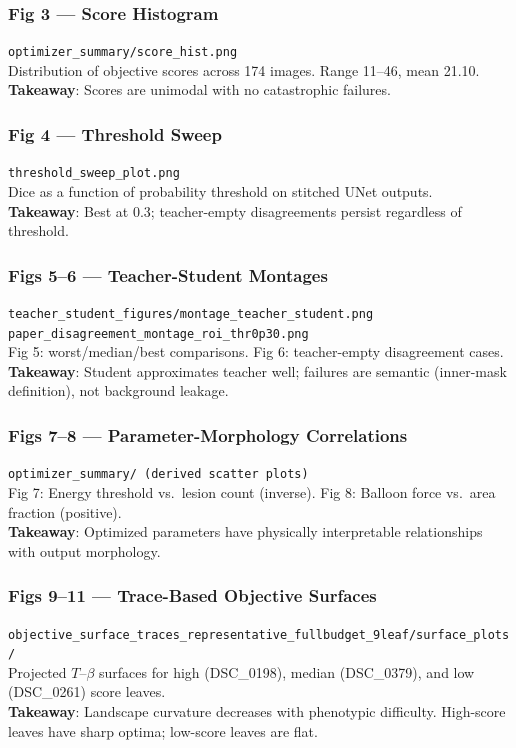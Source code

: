\documentclass[11pt,a4paper]{article}
\newcommand{\filepath}[1]{\texttt{\small #1}}
\begin{document}
\subsubsection{Fig 3 --- Score Histogram}
\filepath{optimizer\_summary/score\_hist.png}\\
Distribution of objective scores across 174 images.  Range 11--46, mean 21.10.\\
\textbf{Takeaway}: Scores are unimodal with no catastrophic failures.

\subsubsection{Fig 4 --- Threshold Sweep}
\filepath{threshold\_sweep\_plot.png}\\
Dice as a function of probability threshold on stitched UNet outputs.\\
\textbf{Takeaway}: Best at 0.3; teacher-empty disagreements persist regardless of threshold.

\subsubsection{Figs 5--6 --- Teacher-Student Montages}
\filepath{teacher\_student\_figures/montage\_teacher\_student.png}\\
\filepath{paper\_disagreement\_montage\_roi\_thr0p30.png}\\
Fig 5: worst/median/best comparisons.  Fig 6: teacher-empty disagreement cases.\\
\textbf{Takeaway}: Student approximates teacher well; failures are semantic (inner-mask definition), not background leakage.

\subsubsection{Figs 7--8 --- Parameter-Morphology Correlations}
\filepath{optimizer\_summary/ (derived scatter plots)}\\
Fig 7: Energy threshold vs.\ lesion count (inverse).  Fig 8: Balloon force vs.\ area fraction (positive).\\
\textbf{Takeaway}: Optimized parameters have physically interpretable relationships with output morphology.

\subsubsection{Figs 9--11 --- Trace-Based Objective Surfaces}
\filepath{objective\_surface\_traces\_representative\_fullbudget\_9leaf/surface\_plots/}\\
Projected $T$--$\beta$ surfaces for high (DSC\_0198), median (DSC\_0379), and low (DSC\_0261) score leaves.\\
\textbf{Takeaway}: Landscape curvature decreases with phenotypic difficulty.  High-score leaves have sharp optima; low-score leaves are flat.
\end{document}
